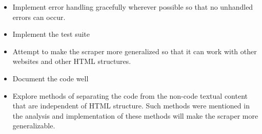\documentclass{scrreprt}
\begin{document}
\begin{itemize}
    \item Implement error handling gracefully wherever possible so that no unhandled errors can occur.
    \item Implement the test suite
    \item Attempt to make the scraper more generalized so that it can work with other websites and other HTML structures.
    \item Document the code well
    \item Explore methods of separating the code from the non-code textual content that are independent of HTML structure. Such methods were mentioned in the analysis and implementation of these methods will make the scraper more generalizable. 
\end{itemize}
\end{document}
